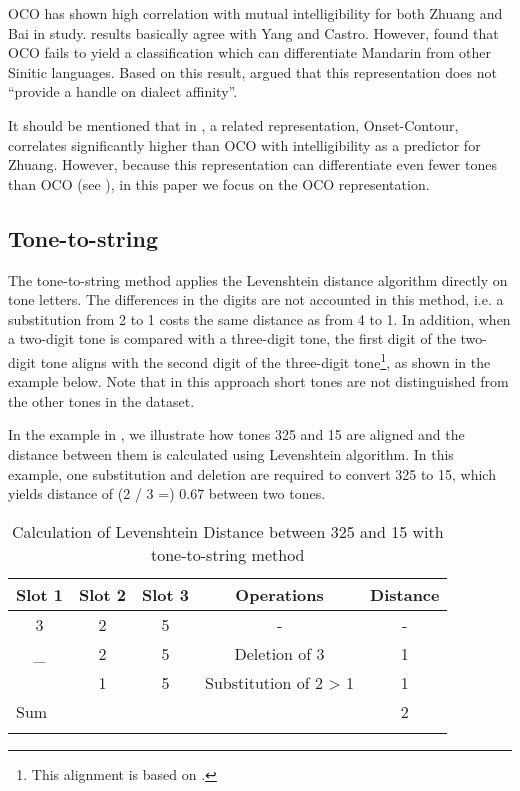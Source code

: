 \documentclass[output=paper, chinesefont]{langscibook}
\begin{document}
OCO has shown high correlation with mutual intelligibility for both Zhuang and Bai in  study.  results basically agree with Yang and Castro. However, \citet[122--125]{Tang2009} found that OCO fails to yield a classification which can differentiate Mandarin from other Sinitic languages. Based on this result, \citet[125]{Tang2009} argued that this representation does not “provide a handle on dialect affinity”.

It should be mentioned that in \citet{YangCastro2008}, a related representation, Onset-Contour, correlates significantly higher than OCO with intelligibility as a predictor for Zhuang. However, because this representation can differentiate even fewer tones than OCO (see ), in this paper we focus on the OCO representation.

\subsection{Tone-to-string}
\label{sec:sung:3.3}
The tone-to-string method applies the Levenshtein distance algorithm directly on  tone letters. The differences in the digits are not accounted in this method, i.e. a substitution from 2 to 1 costs the same distance as from 4 to 1. In addition, when a two-digit tone is compared with a three-digit tone, the first digit of the two-digit tone aligns with the second digit of the three-digit tone\footnote{This alignment is based on \citet{Tang2009}.}, as shown in the example below. Note that in this approach short tones are not distinguished from the other tones in the dataset.

In the example in , we illustrate how tones 325 and 15 are aligned and the distance between them is calculated using Levenshtein algorithm. In this example, one substitution and deletion are required to convert 325 to 15, which yields distance of (2 / 3 =) 0.67 between two tones.


\begin{table}
\begin{tabular}{ccccc}
\lsptoprule
{Slot 1} & {Slot 2} & {Slot 3} & {Operations} & {Distance}\\\midrule
3 & 2 & 5 & {}- & {}-\\
\_ & 2 & 5 & Deletion of 3 & 1\\
& 1 & 5 & Substitution of 2 > 1 & 1\\
\multicolumn{4}{l}{Sum} & 2\\
\lspbottomrule
\end{tabular}
\caption{Calculation of Levenshtein Distance between 325 and 15 with tone-to-string method}
\label{tab:sung:3}
\end{table}
\end{document}
